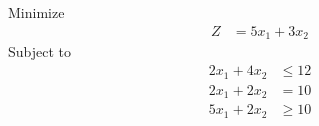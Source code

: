 \documentclass[12pt]{article}
\begin{document}
\subsection{}
Minimize
\begin{align*}
Z              & = 5x_{1}+3x_{2}
\end{align*}
Subject to
\begin{align*}
2x_{1}+4x_{2}  & \le 12                                                                                                                                                                                                                                            \\
2x_{1}+2x_{2}  & = 10                                                                                                                                                                                                                                              \\
5x_{1}+2x_{2}  & \ge 10                                                                                                                                                                                                                                            \\
\end{align*}
\end{document}
